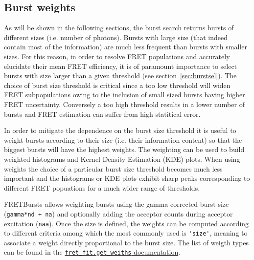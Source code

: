 \subsection{Burst weights}
As will be shown in the following sections, the burst search returns bursts of different sizes (i.e. number of photons). 
Bursts with large size (that indeed contain most of the information) 
are much less frequent than bursts with smaller sizes. For this reason, in order 
to resolve FRET populations and accurately elucidate their mean FRET efficiency, it is of
paramount importance to select bursts with size larger than a given threshold (see 
section~\ref{sec:burstsel}). The choice of burst size threshold is 
critical since a too low threshold will widen FRET subpopulations owing to the 
inclusion of small sized bursts having higher FRET uncertainty. Conversely 
a too high threshold results in a lower number of bursts and FRET estimation 
can suffer from high statitical error.

In order to mitigate the dependence on the burst size threshold it is 
useful to weight bursts according to their size (i.e. their 
information content) so that the biggest bursts will have the highest weights. 
The weighting can be used to build weighted histograms and Kernel Density Estimation (KDE) plots.
When using weights the choice of a particular burst size threshold becomes 
much less important and the histograms or KDE plots exhibit sharp
peaks corresponding to different FRET popuations for a much wider range
of thresholds. 

FRETBursts allows weighting bursts using the gamma-corrected burst size
(\verb|gamma*nd + na|) and optionally adding the acceptor counts during
acceptor excitation (\verb|naa|). Once the size is defined, the weights
can be computed according to different criteria among which the most
commonly used is \verb|'size'|, meaning to associate a weight 
directly proportional to the burst size. The list of weigth types
can be found in the 
\href{http://fretbursts.readthedocs.org/en/latest/fret_fit.html#fretbursts.fret_fit.get_weights}{\texttt{fret\_fit.get\_weiths} documentation}.

